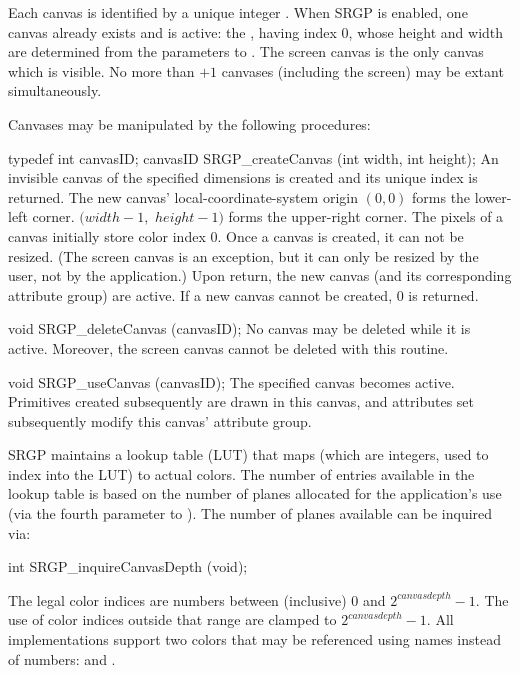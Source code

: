 \newpar
Each canvas is identified by a unique integer .  When SRGP
is enabled, one canvas already exists and is active: the ,
having index 0, whose height and width are determined from the parameters to
.  The screen canvas is the only canvas which is 
visible.  No more than
$+1$ canvases (including the screen) may be extant
simultaneously.



\newpar
Canvases may be manipulated by the following procedures:



\newsynopsis
typedef int canvasID;
canvasID SRGP_createCanvas (int width, int height);
\endsynopsis
An invisible canvas of the specified dimensions is created and its unique index
is returned.  The new canvas' local-coordinate-system origin $(0,0)$ forms the
lower-left corner.  $(width-1,$ $height-1)$ forms
the upper-right corner.  The pixels of a
canvas initially store color index 0.  Once a canvas is created, it
can not be resized.  (The screen canvas is an exception, but it can only be
resized by the user, not by the application.)  Upon return, the new
canvas (and its corresponding attribute group) are active.  If a new canvas
cannot be created, 0 is returned.


\nextsynopsis
void SRGP_deleteCanvas (canvasID);
\endsynopsis
No canvas may be deleted while it is active.  Moreover, the screen canvas
cannot be deleted with this routine.  


\nextsynopsis
void SRGP_useCanvas (canvasID);
\endsynopsis
The specified canvas becomes active.  Primitives created subsequently are drawn
in this canvas, and attributes set subsequently modify this canvas' attribute
group.




SRGP maintains a lookup table (LUT) that maps  (which are
integers, used to index into the LUT) to actual colors.  The number of entries
available in the lookup table is based on the number of planes allocated for
the application's use (via the fourth parameter to ).  The
number of planes available can be inquired via:

\begincode
int SRGP_inquireCanvasDepth (void);
\endcode

\newpar
The legal color indices are numbers between (inclusive) 0 and
$2^{canvasdepth}-1$.  The use of color indices outside that range are clamped
to $2^{canvasdepth}-1$.
All implementations support two colors that may be referenced using names
instead of numbers:  and .

